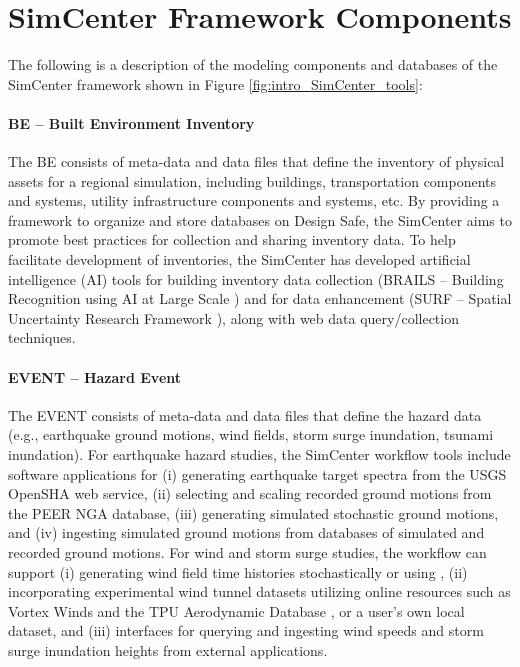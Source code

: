 \section{SimCenter Framework Components}

The following is a description of the modeling components and databases of the SimCenter framework shown in Figure \ref{fig:intro_SimCenter_tools}: 

\paragraph{BE – Built Environment Inventory} The BE consists of meta-data and data files that define the inventory of physical assets for a regional simulation, including buildings, transportation components and systems, utility infrastructure components and systems, etc.  By providing a framework to organize and store databases on Design Safe, the SimCenter aims to promote best practices for collection and sharing inventory data. To help facilitate development of inventories, the SimCenter has developed artificial intelligence (AI) tools for building inventory data collection (BRAILS – Building Recognition using AI at Large Scale ) and for data enhancement (SURF – Spatial Uncertainty Research Framework ), along with web data query/collection techniques. 

\paragraph{EVENT – Hazard Event} The EVENT consists of meta-data and data files that define the hazard data (e.g., earthquake ground motions, wind fields, storm surge inundation, tsunami inundation).  For earthquake hazard studies, the SimCenter workflow tools include software applications for (i) generating earthquake target spectra from the USGS OpenSHA web service, (ii) selecting and scaling recorded ground motions from the PEER NGA database, (iii) generating simulated stochastic ground motions, and (iv) ingesting simulated ground motions from databases of simulated and recorded ground motions.  For wind and storm surge studies, the workflow can support (i) generating wind field time histories stochastically or using , (ii) incorporating experimental wind tunnel datasets utilizing online resources such as Vortex Winds \citep{kareem2017cyber} and the TPU Aerodynamic Database \citep{tpu2020tpu}, or a user’s own local dataset, and (iii) interfaces for querying and ingesting wind speeds and storm surge inundation heights from external applications.

